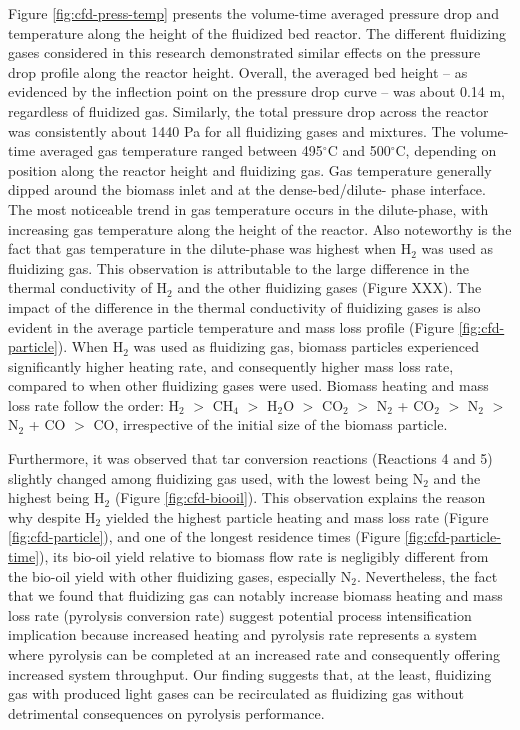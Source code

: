 Figure \ref{fig:cfd-press-temp} presents the volume-time averaged pressure drop and temperature along the height of the fluidized bed reactor. The different fluidizing gases considered in this research demonstrated similar effects on the pressure drop profile along the reactor height. Overall, the averaged bed height – as evidenced by the inflection point on the pressure drop curve – was about 0.14 m, regardless of fluidized gas. Similarly, the total pressure drop across the reactor was consistently about 1440 Pa for all fluidizing gases and mixtures. The volume-time averaged gas temperature ranged between 495$^\circ$C and 500$^\circ$C, depending on position along the reactor height and fluidizing gas. Gas temperature generally dipped around the biomass inlet and at the dense-bed/dilute- phase interface. The most noticeable trend in gas temperature occurs in the dilute-phase, with increasing gas temperature along the height of the reactor. Also noteworthy is the fact that gas temperature in the dilute-phase was highest when H$_2$ was used as fluidizing gas. This observation is attributable to the large difference in the thermal conductivity of H$_2$ and the other fluidizing gases (Figure XXX). The impact of the difference in the thermal conductivity of fluidizing gases is also evident in the average particle temperature and mass loss profile (Figure \ref{fig:cfd-particle}). When H$_2$ was used as fluidizing gas, biomass particles experienced significantly higher heating rate, and consequently higher mass loss rate, compared to when other fluidizing gases were used. Biomass heating and mass loss rate follow the order: H$_2$ $>$ CH$_4$ $>$ H$_2$O $>$ CO$_2$ $>$ N$_2$ + CO$_2$ $>$ N$_2$ $>$ N$_2$ + CO $>$ CO, irrespective of the initial size of the biomass particle.

Furthermore, it was observed that tar conversion reactions (Reactions 4 and 5) slightly changed among fluidizing gas used, with the lowest being N$_2$ and the highest being H$_2$ (Figure \ref{fig:cfd-biooil}). This observation explains the reason why despite H$_2$ yielded the highest particle heating and mass loss rate (Figure \ref{fig:cfd-particle}), and one of the longest residence times (Figure \ref{fig:cfd-particle-time}), its bio-oil yield relative to biomass flow rate is negligibly different from the bio-oil yield with other fluidizing gases, especially N$_2$. Nevertheless, the fact that we found that fluidizing gas can notably increase biomass heating and mass loss rate (pyrolysis conversion rate) suggest potential process intensification implication because increased heating and pyrolysis rate represents a system where pyrolysis can be completed at an increased rate and consequently offering increased system throughput. Our finding suggests that, at the least, fluidizing gas with produced light gases can be recirculated as fluidizing gas without detrimental consequences on pyrolysis performance.


